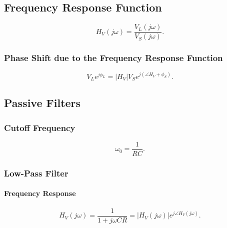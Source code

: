 
\subsection{Frequency Response Function}
\begin{equation*}
  H_V(j\omega) = \frac{V_L (j\omega)}{V_S(j\omega)}
.\end{equation*}

\begin{symbols}
\end{symbols}

\subsubsection{Phase Shift due to the Frequency Response Function}
\begin{equation*}
  V_L e^{j \phi_L} = \left| H_V \right| V_S e^{j \left( \angle H_V + \phi_S \right)}
.\end{equation*}

\begin{symbols}
\end{symbols}


\subsection{Passive Filters}

\subsubsection{Cutoff Frequency}
\begin{equation*}
  \omega_0 = \frac{1}{RC}
.\end{equation*}
\begin{symbols}
\end{symbols}

\subsubsection{Low-Pass Filter}

\paragraph{Frequency Response}
\begin{equation*}
  H_V( j \omega) = \frac{1}{1 + j \omega CR} = \left| H_V ( j \omega) \right| e^{j \angle H_V(j \omega)}
.\end{equation*}

